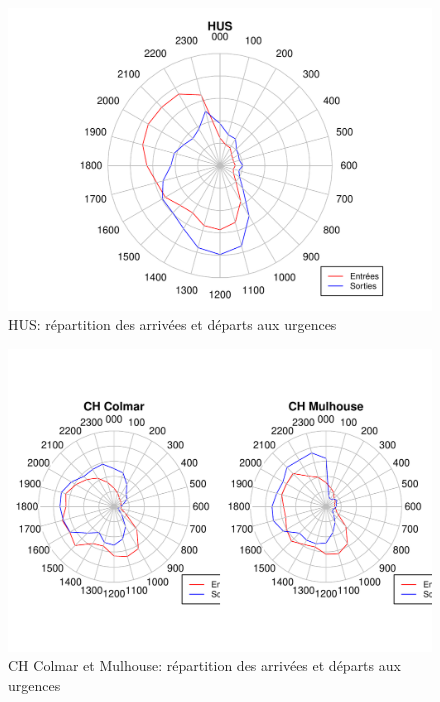 \documentclass[12pt,english,french]{report}\usepackage{graphicx, color}
\makeatletter
\def\maxwidth{ %
  \ifdim\Gin@nat@width>\linewidth
    \linewidth
  \else
    \Gin@nat@width
  \fi
}
\newenvironment{knitrout}{}{} %
\makeatother
\begin{document}
\begin{figure}
\begin{center}
\begin{knitrout}
\color{fgcolor}
\includegraphics[width=\maxwidth]{figure/test2} 

\end{knitrout}

\end{center}
\caption{HUS: répartition des arrivées et départs aux urgences}
\label{passage:hus}
\end{figure}

\begin{figure}
\begin{center}
\begin{knitrout}
\color{fgcolor}
\includegraphics[width=\maxwidth]{figure/test22} 

\end{knitrout}

\end{center}
\caption{CH Colmar et Mulhouse: répartition des arrivées et départs aux urgences}
\label{passage:col}
\end{figure}
\end{document}
